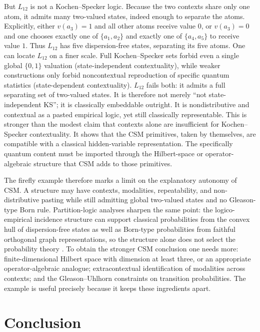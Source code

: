 \documentclass[
aps,
pra,
reprint,
superscriptaddress,
nofootinbib,
longbibliography
]{revtex4-2}
\begin{document}
But $L_{12}$ is not a Kochen--Specker logic.  Because the two contexts share
only one atom, it admits many two-valued states, indeed enough to separate the
atoms.  Explicitly, either $v(a_3)=1$ and all other atoms receive value $0$, or
$v(a_3)=0$ and one chooses exactly one of $\{a_1,a_2\}$ and exactly one of
$\{a_4,a_5\}$ to receive value $1$. Thus $L_{12}$ has five dispersion-free
states, separating its five atoms.  One can locate $L_{12}$ on a finer scale.
Full Kochen--Specker sets forbid even a single global $\{0,1\}$ valuation
(state-independent contextuality), while weaker constructions only forbid
noncontextual reproduction of specific quantum statistics (state-dependent
contextuality).  $L_{12}$ fails both: it admits a full separating set of
two-valued states.  It is therefore not merely ``not state-independent KS''; it
is classically embeddable outright.  It is nondistributive and contextual as a
pasted empirical logic, yet still classically representable.  This is stronger
than the modest claim that contexts alone are insufficient for Kochen--Specker
contextuality.  It shows that the CSM primitives, taken by themselves, are
compatible with a classical hidden-variable representation.  The specifically
quantum content must be imported through the Hilbert-space or
operator-algebraic structure that CSM adds to those primitives.

The firefly example therefore marks a limit on the explanatory autonomy of
CSM.  A structure may have contexts, modalities, repeatability, and
non-distributive pasting while still admitting global two-valued states and no
Gleason-type Born rule.  Partition-logic analyses sharpen the same point:
the logico-empirical incidence structure can support classical probabilities
from the convex hull of dispersion-free states as well as Born-type
probabilities from faithful orthogonal graph representations, so the
structure alone does not select the probability theory
\cite{svozil2020graphs}.  To obtain the stronger CSM conclusion one needs
more: finite-dimensional Hilbert space with dimension at least three, or an
appropriate operator-algebraic analogue; extracontextual identification of
modalities across contexts; and the Gleason--Uhlhorn constraints on
transition probabilities.  The example is useful precisely because it keeps
these ingredients apart.

\section{Conclusion}
\end{document}
